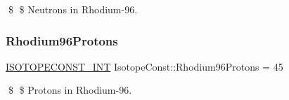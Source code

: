 \$ \$ Neutrons in Rhodium-\/96. \mbox{\label{group___isotope_const-_rhodium-_rh96_gacc099c058802423e19d8b878c5ef3784}} 
\subsubsection{\texorpdfstring{Rhodium96\+Protons}{Rhodium96Protons}}
{\footnotesize\ttfamily \mbox{\hyperlink{group___isotope_const-_macros_ga5f18360b3e99483a35c32d789e62621c}{I\+S\+O\+T\+O\+P\+E\+C\+O\+N\+S\+T\+\_\+\+I\+NT}} Isotope\+Const\+::\+Rhodium96\+Protons = 45}

\$ \$ Protons in Rhodium-\/96. 